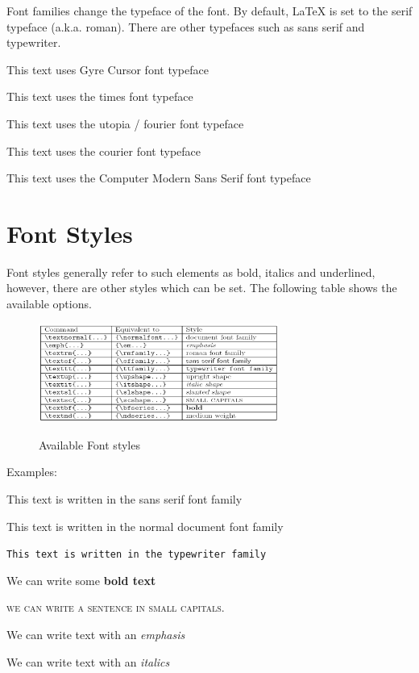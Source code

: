 Font families change the typeface of the font. By default, LaTeX is set to the serif typeface (a.k.a. roman). There are other typefaces such as sans serif and typewriter.

{\selectfont This text uses Gyre Cursor font typeface}

{\selectfont This text uses the times font typeface}

{\selectfont This text uses the utopia / fourier font typeface}

{\selectfont This text uses the courier font typeface}

 {\selectfont This text uses the Computer Modern Sans Serif font typeface}

\newpage

\section{Font Styles}

Font styles generally refer to such elements as bold, italics and underlined, however, there are other styles which can be set. The following table shows the available options.

\begin{figure}[h]
\centering
\includegraphics[width=0.7\textwidth]{images/Latex_styles_table.png}
\caption{Available Font styles}
\label{fig:x Available Font styles} \parencite{wiki:003}
\end{figure}



\begin{adjustwidth}{2cm}{2cm}

Examples:

\textsf{This text is written in the sans serif font family}

\textnormal{This text is written in the normal document font family}

\texttt{This text is written in the typewriter family}

We can write some \textbf{bold text}

\textsc{we can write a sentence in small capitals.} 

We can write text with an \emph{emphasis}

We can write text with an \textit{italics}

\end{adjustwidth}

